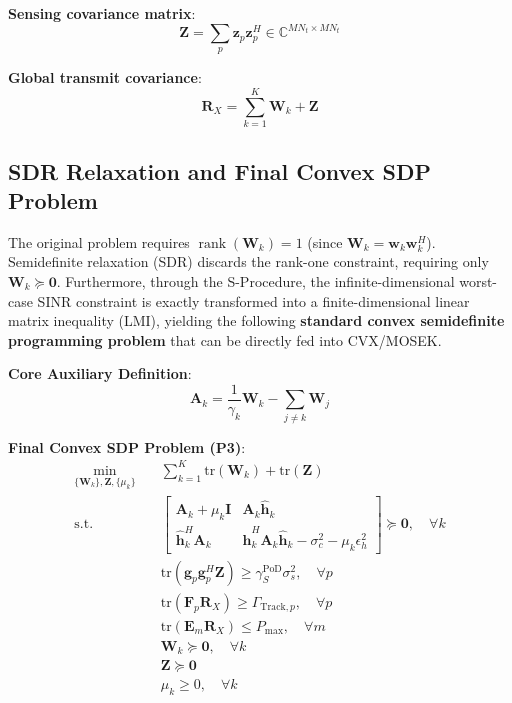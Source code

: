 \documentclass[12pt,a4paper]{article}
\newcommand{\vect}[1]{\mathbf{#1}}
\newcommand{\mat}[1]{\mathbf{#1}}
\newcommand{\tr}{\text{tr}}
\DeclareMathOperator{\rank}{rank}
\begin{document}
\textbf{Sensing covariance matrix}:
\begin{equation}
\mat{Z} = \sum_p \vect{z}_p \vect{z}_p^H \in \mathbb{C}^{MN_t \times MN_t} \tag{16}
\end{equation}

\textbf{Global transmit covariance}:
\begin{equation}
\mat{R}_X = \sum_{k=1}^K \mat{W}_k + \mat{Z} \tag{17}
\end{equation}

\subsection{SDR Relaxation and Final Convex SDP Problem}

The original problem requires $\rank(\mat{W}_k) = 1$ (since $\mat{W}_k = \vect{w}_k \vect{w}_k^H$). Semidefinite relaxation (SDR) discards the rank-one constraint, requiring only $\mat{W}_k \succeq \mat{0}$. Furthermore, through the S-Procedure, the infinite-dimensional worst-case SINR constraint is exactly transformed into a finite-dimensional linear matrix inequality (LMI), yielding the following \textbf{standard convex semidefinite programming problem} that can be directly fed into CVX/MOSEK.

\textbf{Core Auxiliary Definition}:
\begin{equation}
\mat{A}_k = \frac{1}{\gamma_k} \mat{W}_k - \sum_{j \neq k} \mat{W}_j
\end{equation}

\textbf{Final Convex SDP Problem (P3)}:
\begin{align}
\min_{\{\mat{W}_k\}, \mat{Z}, \{\mu_k\}} \quad & \sum_{k=1}^K \tr(\mat{W}_k) + \tr(\mat{Z}) \tag{P3} \\
\text{s.t.} \quad & \begin{bmatrix} \mat{A}_k + \mu_k \mat{I} & \mat{A}_k \hat{\vect{h}}_k \\[1.5ex] \hat{\vect{h}}_k^H \mat{A}_k & \hat{\vect{h}}_k^H \mat{A}_k \hat{\vect{h}}_k - \sigma_c^2 - \mu_k \epsilon_h^2 \end{bmatrix} \succeq \mat{0}, \quad \forall k \label{eq:lmi_comm} \\
& \tr(\vect{g}_p \vect{g}_p^H \mat{Z}) \geq \gamma_S^{\text{PoD}} \sigma_s^2, \quad \forall p \label{eq:sinr_sens_sdp} \\
& \tr(\mat{F}_p \mat{R}_X) \geq \Gamma_{\text{Track},p}, \quad \forall p \label{eq:pcrb_sdp} \\
& \tr(\mat{E}_m \mat{R}_X) \leq P_{\max}, \quad \forall m \label{eq:power_sdp} \\
& \mat{W}_k \succeq \mat{0}, \quad \forall k \label{eq:psd_w} \\
& \mat{Z} \succeq \mat{0} \label{eq:psd_z} \\
& \mu_k \geq 0, \quad \forall k \label{eq:mu_nonneg}
\end{align}
\end{document}
